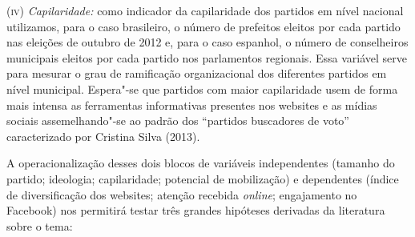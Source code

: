(\textsc{iv}) \emph{Capilaridade:} como indicador da capilaridade dos partidos
em nível nacional utilizamos, para o caso brasileiro, o número de
prefeitos eleitos por cada partido nas eleições de outubro de 2012 e,
para o caso espanhol, o número de conselheiros municipais eleitos por
cada partido nos parlamentos regionais. Essa variável serve para mesurar
o grau de ramificação organizacional dos diferentes partidos em nível
municipal. Espera"-se que partidos com maior capilaridade usem de forma
mais intensa as ferramentas informativas presentes nos websites e as
mídias sociais assemelhando"-se ao padrão dos ``partidos buscadores de
voto'' caracterizado por Cristina Silva (2013).

A operacionalização desses dois blocos de variáveis independentes
(tamanho do partido; ideologia; capilaridade; potencial de mobilização)
e dependentes (índice de diversificação dos websites; atenção recebida
\emph{\emph{online}}; engajamento no Facebook) nos permitirá testar três grandes
hipóteses derivadas da literatura sobre o tema:

